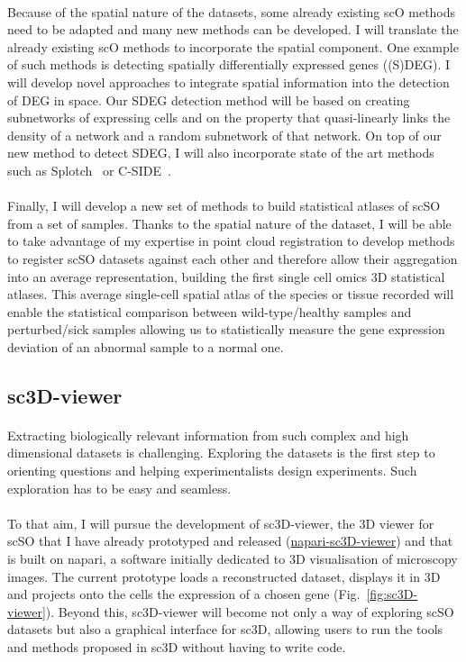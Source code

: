 \paragraph{}Because of the spatial nature of the datasets, some already existing scO methods need to be adapted and many new methods can be developed.
I will translate the already existing scO methods to incorporate the spatial component.
One example of such methods is detecting spatially differentially expressed genes ((S)DEG).
I will develop novel approaches to integrate spatial information into the detection of DEG in space.
Our SDEG detection method will be based on creating subnetworks of expressing cells and on the property that quasi-linearly links the density of a network and a random subnetwork of that network.
On top of our new method to detect SDEG, I will also incorporate state of the art methods such as Splotch~\cite{Aijo2019} or C-SIDE~\cite{Cable2021}.
\paragraph{}Finally, I will develop a new set of methods to build statistical atlases of scSO from a set of samples.
Thanks to the spatial nature of the dataset, I will be able to take advantage of my expertise in point cloud registration to develop methods to register scSO datasets against each other and therefore allow their aggregation into an average representation, building the first single cell omics 3D statistical atlases.
This average single-cell spatial atlas of the species or tissue recorded will enable the statistical comparison between wild-type/healthy samples and perturbed/sick samples allowing us to statistically measure the gene expression deviation of an abnormal sample to a normal one.
\subsection{sc3D-viewer}
\paragraph{}Extracting biologically relevant information from such complex and high dimensional datasets is challenging.
Exploring the datasets is the first step to orienting questions and helping experimentalists design experiments.
Such exploration has to be easy and seamless.
\paragraph{}To that aim, I will pursue the development of sc3D-viewer, the 3D viewer for scSO that I have already prototyped and released (\href{https://www.github.com/guignardlab/napari-sc3D-viewer}{napari-sc3D-viewer}) and that is built on napari, a software initially dedicated to 3D visualisation of microscopy images.
The current prototype loads a reconstructed dataset, displays it in 3D and projects onto the cells the expression of a chosen gene (Fig.~\ref{fig:sc3D-viewer}).
Beyond this, sc3D-viewer will become not only a way of exploring scSO datasets but also a graphical interface for sc3D, allowing users to run the tools and methods proposed in sc3D without having to write code.
